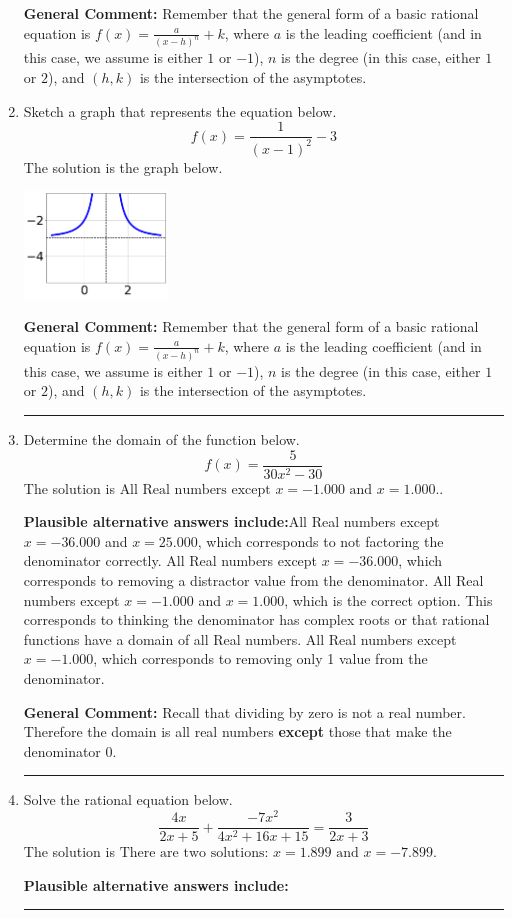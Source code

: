 \documentclass{extbook}[14pt]
\newcommand{\litem}[1]{\item #1

\rule{\textwidth}{0.4pt}}
\begin{document}
\begin{enumerate}
{\textbf{General Comment:} Remember that the general form of a basic rational equation is $ f(x) = \frac{a}{(x-h)^n} + k$, where $a$ is the leading coefficient (and in this case, we assume is either $1$ or $-1$), $n$ is the degree (in this case, either $1$ or $2$), and $(h, k)$ is the intersection of the asymptotes.
}
\litem{
Sketch a graph that represents the equation below.
\[ f(x) = \frac{1}{(x - 1)^2} - 3 \]The solution is the graph below.
    \begin{center}
        \includegraphics[width=0.3\textwidth]{../Figures/rationalEquationToGraphDA.png}
    \end{center}

\textbf{General Comment:} Remember that the general form of a basic rational equation is $ f(x) = \frac{a}{(x-h)^n} + k$, where $a$ is the leading coefficient (and in this case, we assume is either $1$ or $-1$), $n$ is the degree (in this case, either $1$ or $2$), and $(h, k)$ is the intersection of the asymptotes.
}
\litem{
Determine the domain of the function below.
\[ f(x) = \frac{5}{30x^{2} -30} \]The solution is \( \text{All Real numbers except } x = -1.000 \text{ and } x = 1.000. \).\begin{enumerate}[label=\Alph*.]
\textbf{Plausible alternative answers include:}All Real numbers except $x = -36.000$ and $x = 25.000$, which corresponds to not factoring the denominator correctly.
All Real numbers except $x = -36.000$, which corresponds to removing a distractor value from the denominator.
All Real numbers except $x = -1.000$ and $x = 1.000$, which is the correct option.
This corresponds to thinking the denominator has complex roots or that rational functions have a domain of all Real numbers.
All Real numbers except $x = -1.000$, which corresponds to removing only 1 value from the denominator.
\end{enumerate}

\textbf{General Comment:} Recall that dividing by zero is not a real number. Therefore the domain is all real numbers \textbf{except} those that make the denominator 0.
}
\litem{
Solve the rational equation below.
\[ \frac{4x}{2x + 5} + \frac{-7x^{2}}{4x^{2} +16 x + 15} = \frac{3}{2x + 3} \]The solution is \( \text{There are two solutions: } x = 1.899 \text{ and } x = -7.899 \).\begin{enumerate}[label=\Alph*.]
\textbf{Plausible alternative answers include:}


\end{enumerate}}
\end{enumerate}
\end{document}
